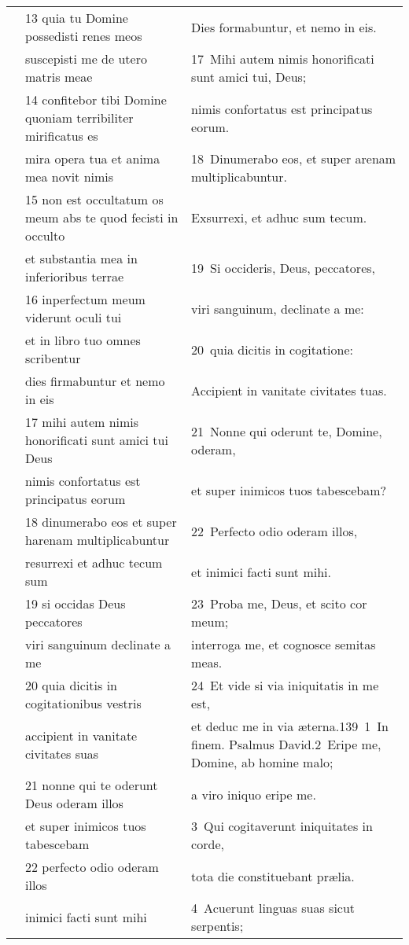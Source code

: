 \documentclass{article}
\begin{document}
\begin{longtable}{@{}p{}p{}p{}@{}}
	&	13 quia tu Domine possedisti renes meos	&	Dies formabuntur, et nemo in eis.	\\
	&	suscepisti me de utero matris meae	&	17 Mihi autem nimis honorificati sunt amici tui, Deus;	\\
	&	14 confitebor tibi Domine quoniam terribiliter mirificatus es	&	nimis confortatus est principatus eorum.	\\
	&	mira opera tua et anima mea novit nimis	&	18 Dinumerabo eos, et super arenam multiplicabuntur.	\\
	&	15 non est occultatum os meum abs te quod fecisti in occulto	&	Exsurrexi, et adhuc sum tecum.	\\
	&	et substantia mea in inferioribus terrae	&	19 Si occideris, Deus, peccatores,	\\
	&	16 inperfectum meum viderunt oculi tui	&	viri sanguinum, declinate a me:	\\
	&	et in libro tuo omnes scribentur	&	20 quia dicitis in cogitatione:	\\
	&	dies firmabuntur et nemo in eis	&	Accipient in vanitate civitates tuas.	\\
	&	17 mihi autem nimis honorificati sunt amici tui Deus	&	21 Nonne qui oderunt te, Domine, oderam,	\\
	&	nimis confortatus est principatus eorum	&	et super inimicos tuos tabescebam?	\\
	&	18 dinumerabo eos et super harenam multiplicabuntur	&	22 Perfecto odio oderam illos,	\\
	&	resurrexi et adhuc tecum sum	&	et inimici facti sunt mihi.	\\
	&	19 si occidas Deus peccatores	&	23 Proba me, Deus, et scito cor meum;	\\
	&	viri sanguinum declinate a me	&	interroga me, et cognosce semitas meas.	\\
	&	20 quia dicitis in cogitationibus vestris	&	24 Et vide si via iniquitatis in me est,	\\
	&	accipient in vanitate civitates suas	&	et deduc me in via æterna.139 1 In finem. Psalmus David.2 Eripe me, Domine, ab homine malo;	\\
	&	21 nonne qui te oderunt Deus oderam illos	&	a viro iniquo eripe me.	\\
	&	et super inimicos tuos tabescebam	&	3 Qui cogitaverunt iniquitates in corde,	\\
	&	22 perfecto odio oderam illos	&	tota die constituebant prælia.	\\
	&	inimici facti sunt mihi	&	4 Acuerunt linguas suas sicut serpentis;	\\

\end{longtable}
\end{document}
